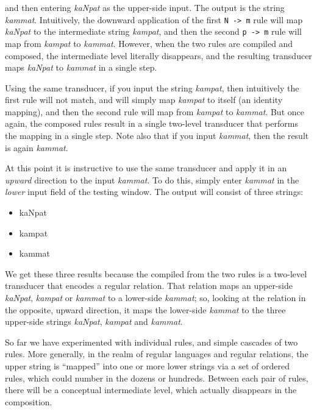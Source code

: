\noindent
and then entering \emph{kaNpat} as the upper-side input.  The output is the string
\emph{kammat}.  Intuitively, the downward application of the first \texttt{N ->
m} rule will map \emph{kaNpat} to the intermediate string \emph{kampat}, and then
the second \texttt{p -> m} rule will map from \emph{kampat} to \emph{kammat}.
However, when the two rules are compiled and composed, the
intermediate level literally disappears, and the resulting transducer maps \emph{kaNpat} to
\emph{kammat} in a single step.

Using the same transducer, if
you input the string \emph{kampat}, then intuitively the first rule will not match, and
will simply map \emph{kampat} to itself (an identity mapping), and then the second
rule will map from \emph{kampat} to \emph{kammat}.  But once again, the composed
rules result in a single two-level transducer that performs the mapping in a
single step.  Note also that if you input \emph{kammat}, then the result is again
\emph{kammat}.

At this point it is instructive to use the same transducer and apply it in an
\emph{upward} direction to the input \emph{kammat}.  To do this, simply enter
\emph{kammat} in the \emph{lower} input field of the testing window.  The output will
consist of three strings:

\begin{itemize}
\item
kaNpat
\item
kampat
\item
kammat
\end{itemize}

\noindent
We get these three results because the \fst{} compiled from the two rules is a
two-level transducer that encodes a regular relation.  That relation maps an
upper-side \emph{kaNpat}, \emph{kampat} or \emph{kammat} to a lower-side
\emph{kammat}; so, looking at the relation in the opposite, upward direction, it maps the
lower-side \emph{kammat} to the three upper-side strings \emph{kaNpat}, \emph{kampat}
and \emph{kammat}.

So far we have experimented with individual rules, and simple cascades of two rules.
More generally, in the realm of regular languages and
regular relations, the upper string  is ``mapped'' into one or more 
lower strings via a set of ordered rules, which could number in the dozens or hundreds.  Between each
pair of rules, there will be a conceptual intermediate level, which
actually disappears in the composition.


